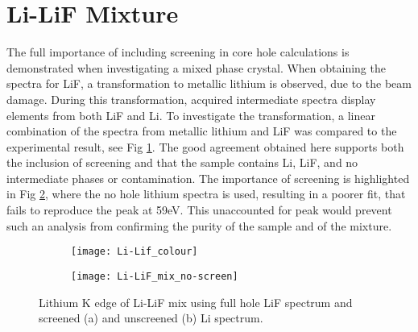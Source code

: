 \section{Li-LiF Mixture}
The full importance of including screening in core hole calculations is demonstrated when investigating a mixed phase crystal.  When obtaining the spectra for LiF, a transformation to metallic lithium is observed, due to the beam damage.   During this transformation, acquired intermediate spectra display elements from both LiF and Li.  To investigate the transformation, a linear combination of the spectra from metallic lithium and LiF was compared to the experimental result, see Fig \ref{mix-screened}.  The good agreement obtained here supports both the inclusion of screening and that the sample contains  Li, LiF, and no intermediate phases or contamination.  The importance of screening is highlighted in Fig \ref{mix-unscreened}, where the no hole lithium spectra is used, resulting in a poorer fit, that fails to reproduce the peak at 59eV.  This unaccounted for peak would prevent such an  analysis from confirming the purity of the sample and of the mixture.  



\begin{figure}
	\centering
	\begin{subfigure}{0.45\textwidth}
		\texttt{[image: Li-Lif\_colour]}
		\caption{}
		\label{mix-screened}
	\end{subfigure}
\hfill
	\begin{subfigure}{0.45\textwidth}
		\texttt{[image: Li-LiF\_mix\_no-screen]}
		\caption{}
		\label{mix-unscreened}
	\end{subfigure}
	\caption{Lithium K edge of Li-LiF mix using full hole LiF spectrum and screened (a) and unscreened (b) Li spectrum. }

\label{Li-LiF_mix_screened}
\end{figure}



